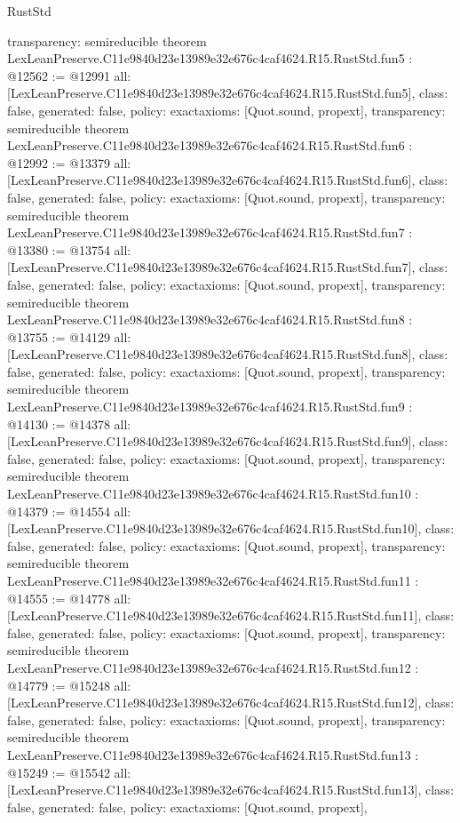 \begin{lexlean}{RustStd}
\begin{coremodule}
{  transparency: semireducible
}
theorem LexLeanPreserve.C11e9840d23e13989e32e676c4caf4624.R15.RustStd.fun5 : @12562 := @12991 {
  all: [LexLeanPreserve.C11e9840d23e13989e32e676c4caf4624.R15.RustStd.fun5],
  class: false,
  generated: false,
  policy: exact{axioms: [Quot.sound, propext]},
  transparency: semireducible
}
theorem LexLeanPreserve.C11e9840d23e13989e32e676c4caf4624.R15.RustStd.fun6 : @12992 := @13379 {
  all: [LexLeanPreserve.C11e9840d23e13989e32e676c4caf4624.R15.RustStd.fun6],
  class: false,
  generated: false,
  policy: exact{axioms: [Quot.sound, propext]},
  transparency: semireducible
}
theorem LexLeanPreserve.C11e9840d23e13989e32e676c4caf4624.R15.RustStd.fun7 : @13380 := @13754 {
  all: [LexLeanPreserve.C11e9840d23e13989e32e676c4caf4624.R15.RustStd.fun7],
  class: false,
  generated: false,
  policy: exact{axioms: [Quot.sound, propext]},
  transparency: semireducible
}
theorem LexLeanPreserve.C11e9840d23e13989e32e676c4caf4624.R15.RustStd.fun8 : @13755 := @14129 {
  all: [LexLeanPreserve.C11e9840d23e13989e32e676c4caf4624.R15.RustStd.fun8],
  class: false,
  generated: false,
  policy: exact{axioms: [Quot.sound, propext]},
  transparency: semireducible
}
theorem LexLeanPreserve.C11e9840d23e13989e32e676c4caf4624.R15.RustStd.fun9 : @14130 := @14378 {
  all: [LexLeanPreserve.C11e9840d23e13989e32e676c4caf4624.R15.RustStd.fun9],
  class: false,
  generated: false,
  policy: exact{axioms: [Quot.sound, propext]},
  transparency: semireducible
}
theorem LexLeanPreserve.C11e9840d23e13989e32e676c4caf4624.R15.RustStd.fun10 : @14379 := @14554 {
  all: [LexLeanPreserve.C11e9840d23e13989e32e676c4caf4624.R15.RustStd.fun10],
  class: false,
  generated: false,
  policy: exact{axioms: [Quot.sound, propext]},
  transparency: semireducible
}
theorem LexLeanPreserve.C11e9840d23e13989e32e676c4caf4624.R15.RustStd.fun11 : @14555 := @14778 {
  all: [LexLeanPreserve.C11e9840d23e13989e32e676c4caf4624.R15.RustStd.fun11],
  class: false,
  generated: false,
  policy: exact{axioms: [Quot.sound, propext]},
  transparency: semireducible
}
theorem LexLeanPreserve.C11e9840d23e13989e32e676c4caf4624.R15.RustStd.fun12 : @14779 := @15248 {
  all: [LexLeanPreserve.C11e9840d23e13989e32e676c4caf4624.R15.RustStd.fun12],
  class: false,
  generated: false,
  policy: exact{axioms: [Quot.sound, propext]},
  transparency: semireducible
}
theorem LexLeanPreserve.C11e9840d23e13989e32e676c4caf4624.R15.RustStd.fun13 : @15249 := @15542 {
  all: [LexLeanPreserve.C11e9840d23e13989e32e676c4caf4624.R15.RustStd.fun13],
  class: false,
  generated: false,
  policy: exact{axioms: [Quot.sound, propext]},
}
\end{coremodule}
\end{lexlean}
